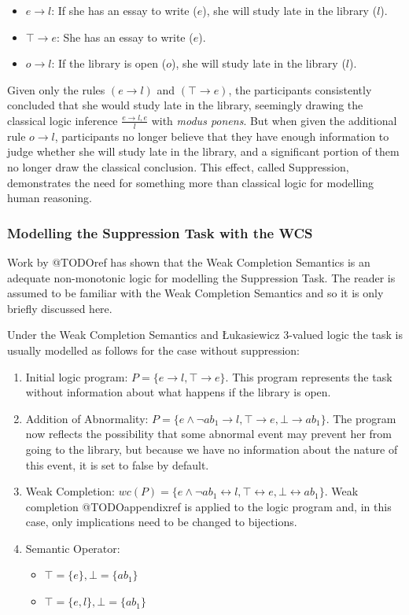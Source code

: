 \documentclass{article}
\begin{document}
\begin{itemize}
\item $e \rightarrow l$: If she has an essay to write ($e$), she will study late in the library ($l$).
\item $\top \rightarrow e$: She has an essay to write ($e$).
\item $o\rightarrow l$: If the library is open ($o$), she will study late in the library ($l$).
\end{itemize}

Given only the rules $(e \rightarrow l)$ and $(\top \rightarrow e)$, the participants consistently concluded that she would study late in the library, seemingly drawing the classical logic inference $\frac{e \rightarrow l, e}{l}$ with \textit{modus ponens}. But when given the additional rule $o\rightarrow l$, participants no longer believe that they have enough information to judge whether she will study late in the library, and a significant portion of them no longer draw the classical conclusion. This effect, called Suppression, demonstrates the need for something more than classical logic for modelling human reasoning.

\subsubsection{Modelling the Suppression Task with the WCS}
Work by @TODOref has shown that the Weak Completion Semantics is an adequate non-monotonic logic for modelling the Suppression Task. The reader is assumed to be familiar with the Weak Completion Semantics and so it is only briefly discussed here.

Under the Weak Completion Semantics and \L ukasiewicz 3-valued logic the task is usually modelled as follows for the case without suppression:
\begin{enumerate}
\item Initial logic program: $P = \{e \rightarrow l, \top \rightarrow e \}$. This program represents the task without information about what happens if the library is open.
\item Addition of Abnormality: $P = \{e \land \lnot ab_1 \rightarrow l, \top \rightarrow e, \bot \rightarrow ab_1 \}$. The program now reflects the possibility that some abnormal event may prevent her from going to the library, but because we have no information about the nature of this event, it is set to false by default.
\item Weak Completion: $wc(P) = \{e \land \lnot ab_1 \leftrightarrow l, \top \leftrightarrow e, \bot \leftrightarrow ab_1 \}$. Weak completion @TODOappendixref is applied to the logic program and, in this case, only implications need to be changed to bijections.
\item Semantic Operator:
\begin{itemize}
\item $\top=\{e\}, \bot=\{ab_1\}$
\item $\top=\{e,l\}, \bot=\{ab_1\}$
\end{itemize}
\end{enumerate}
\end{document}
